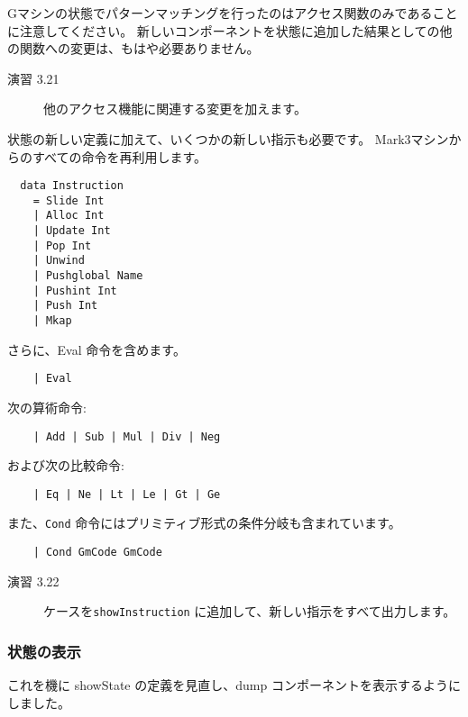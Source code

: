 \documentclass{jarticle}
\begin{document}
Gマシンの状態でパターンマッチングを行ったのはアクセス関数のみであることに注意してください。
新しいコンポーネントを状態に追加した結果としての他の関数への変更は、もはや必要ありません。

\begin{description}
	\item[演習 3.21] 他のアクセス機能に関連する変更を加えます。
\end{description}

状態の新しい定義に加えて、いくつかの新しい指示も必要です。
Mark3マシンからのすべての命令を再利用します。

\begin{verbatim}
  data Instruction
    = Slide Int
    | Alloc Int
    | Update Int
    | Pop Int
    | Unwind
    | Pushglobal Name
    | Pushint Int
    | Push Int
    | Mkap
\end{verbatim}

さらに、Eval 命令を含めます。

\begin{verbatim}
    | Eval
\end{verbatim}

次の算術命令:

\begin{verbatim}
    | Add | Sub | Mul | Div | Neg
\end{verbatim}

および次の比較命令:

\begin{verbatim}
    | Eq | Ne | Lt | Le | Gt | Ge
\end{verbatim}

また、\texttt{Cond} 命令にはプリミティブ形式の条件分岐も含まれています。

\begin{verbatim}
    | Cond GmCode GmCode
\end{verbatim}

\begin{description}
	\item[演習 3.22] ケースを\texttt{showInstruction} に追加して、新しい指示をすべて出力します。
\end{description}

\subsubsection{状態の表示}

これを機に showState の定義を見直し、dump コンポーネントを表示するようにしました。
\end{document}
